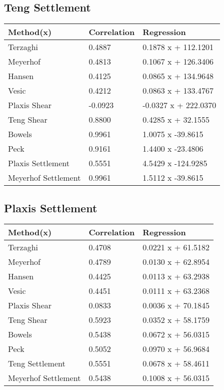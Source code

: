 \subsection{Teng Settlement}
\begin{tabularx}{\textwidth}{ | p{} | X | X | }
\hline
\textbf{Method(x)} & \textbf{Correlation} & \textbf{Regression} \\
\hline
 Terzaghi & 0.4887 & 0.1878 x + 112.1201\\
 Meyerhof & 0.4813 & 0.1067 x + 126.3406\\
 Hansen & 0.4125 & 0.0865 x + 134.9648\\
 Vesic & 0.4212 & 0.0863 x + 133.4767\\
 Plaxis Shear & -0.0923 & -0.0327 x + 222.0370\\
 Teng Shear & 0.8800 & 0.4285 x + 32.1555\\
 Bowels & 0.9961 & 1.0075 x  -39.8615\\
 Peck & 0.9161 & 1.4400 x  -23.4806\\
 Plaxis Settlement & 0.5551 & 4.5429 x  -124.9285\\
 Meyerhof Settlement & 0.9961 & 1.5112 x  -39.8615\\
\hline
\end{tabularx}
\subsection{Plaxis Settlement}
\begin{tabularx}{\textwidth}{ | p{} | X | X | }
\hline
\textbf{Method(x)} & \textbf{Correlation} & \textbf{Regression} \\
\hline
 Terzaghi & 0.4708 & 0.0221 x + 61.5182\\
 Meyerhof & 0.4789 & 0.0130 x + 62.8954\\
 Hansen & 0.4425 & 0.0113 x + 63.2938\\
 Vesic & 0.4451 & 0.0111 x + 63.2368\\
 Plaxis Shear & 0.0833 & 0.0036 x + 70.1845\\
 Teng Shear & 0.5923 & 0.0352 x + 58.1759\\
 Bowels & 0.5438 & 0.0672 x + 56.0315\\
 Peck & 0.5052 & 0.0970 x + 56.9684\\
 Teng Settlement & 0.5551 & 0.0678 x + 58.4611\\
 Meyerhof Settlement & 0.5438 & 0.1008 x + 56.0315\\
\hline
\end{tabularx}
